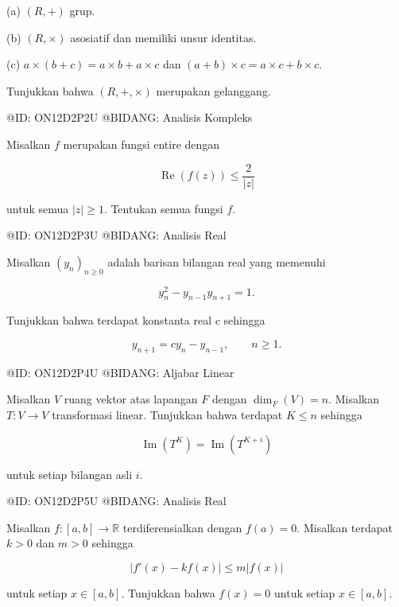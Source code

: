 (a) $(R,+)$ grup.

(b) $(R,\times)$ asosiatif dan memiliki unsur identitas.

(c) $a\times(b+c)=a\times b+a\times c$ dan $(a+b)\times c=a\times c+b\times c$.

Tunjukkan bahwa $(R,+,\times)$ merupakan gelanggang.

@ID: ON12D2P2U
@BIDANG: Analisis Kompleks

Misalkan $f$ merupakan fungsi entire dengan

$$
\operatorname{Re}(f(z))
\le
\frac{2}{|z|}
$$

untuk semua $|z|\ge1$. Tentukan semua fungsi $f$.

@ID: ON12D2P3U
@BIDANG: Analisis Real

Misalkan $(y_n)_{n\ge0}$ adalah barisan bilangan real yang memenuhi

$$
y_n^2-y_{n-1}y_{n+1}=1.
$$

Tunjukkan bahwa terdapat konstanta real $c$ sehingga

$$
y_{n+1}=cy_n-y_{n-1},
\qquad n\ge1.
$$

@ID: ON12D2P4U
@BIDANG: Aljabar Linear

Misalkan $V$ ruang vektor atas lapangan $F$ dengan $\dim_F(V)=n$. Misalkan $T:V\to V$ transformasi linear. Tunjukkan bahwa terdapat $K\le n$ sehingga

$$
\operatorname{Im}(T^K)=\operatorname{Im}(T^{K+i})
$$

untuk setiap bilangan asli $i$.

@ID: ON12D2P5U
@BIDANG: Analisis Real

Misalkan $f:[a,b]\to\mathbb R$ terdiferensialkan dengan $f(a)=0$. Misalkan terdapat $k>0$ dan $m>0$ sehingga

$$
|f'(x)-kf(x)|
\le
m|f(x)|
$$

untuk setiap $x\in[a,b]$. Tunjukkan bahwa $f(x)=0$ untuk setiap $x\in[a,b]$.